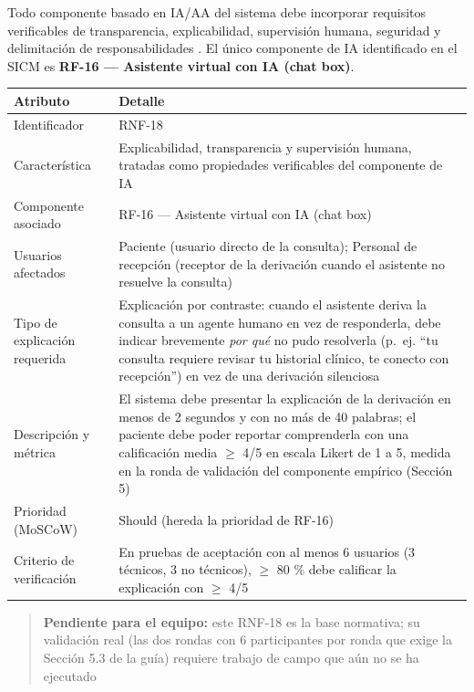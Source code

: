 \documentclass[11pt,a4paper]{article}
\begin{document}
	Todo componente basado en IA/AA del sistema debe incorporar requisitos verificables de transparencia, explicabilidad, supervisión humana, seguridad y delimitación de responsabilidades \cite{whoai2021,euaiact2024,fda2022,topol2019}. El único componente de IA identificado en el SICM es \textbf{RF-16 --- Asistente virtual con IA (chat box)}.
	
	\begin{longtable}{p{} p{}}
		
		\toprule
		\textbf{Atributo} & \textbf{Detalle} \\
		\midrule
		\endhead
		
		Identificador & RNF-18 \\
		Característica & Explicabilidad, transparencia y supervisión humana, tratadas como propiedades verificables del componente de IA \cite{whoai2021,euaiact2024} \\
		Componente asociado & RF-16 --- Asistente virtual con IA (chat box) \\
		Usuarios afectados & Paciente (usuario directo de la consulta); Personal de recepción (receptor de la derivación cuando el asistente no resuelve la consulta) \\
		Tipo de explicación requerida & Explicación por contraste: cuando el asistente deriva la consulta a un agente humano en vez de responderla, debe indicar brevemente \emph{por qué} no pudo resolverla (p.~ej. ``tu consulta requiere revisar tu historial clínico, te conecto con recepción'') en vez de una derivación silenciosa \\
		Descripción y métrica & El sistema debe presentar la explicación de la derivación en menos de 2 segundos y con no más de 40 palabras; el paciente debe poder reportar comprenderla con una calificación media \(\geq\) 4/5 en escala Likert de 1 a 5, medida en la ronda de validación del componente empírico (Sección 5) \\
		Prioridad (MoSCoW) & Should (hereda la prioridad de RF-16) \\
		Criterio de verificación & En pruebas de aceptación con al menos 6 usuarios (3 técnicos, 3 no técnicos), \(\geq\) 80 \% debe calificar la explicación con \(\geq\) 4/5 \\
		\bottomrule
	\end{longtable}
	
	\begin{quote}
		\textbf{Pendiente para el equipo:} este RNF-18 es la base normativa; su validación real (las dos rondas con 6 participantes por ronda que exige la Sección 5.3 de la guía) requiere trabajo de campo que aún no se ha ejecutado 
	\end{quote}
	
\end{document}
